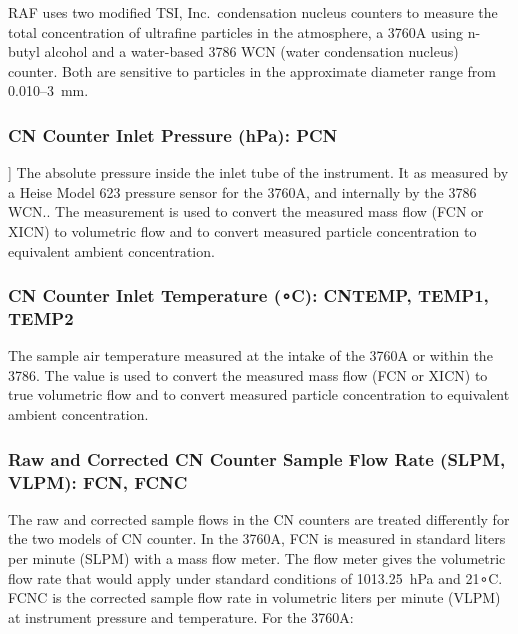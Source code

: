 \documentclass[
]{book}
\begin{document}
RAF uses two modified TSI, Inc.~condensation nucleus counters to measure the total concentration of ultrafine particles in the atmosphere, a 3760A using n-butyl alcohol and a water-based 3786 WCN (water condensation nucleus) counter. Both are sensitive to particles in the approximate diameter range from 0.010--3~\foreignlanguage{greek}{m}m.

\hypertarget{pcn}{%
\subsubsection*{CN Counter Inlet Pressure (hPa): PCN}\label{pcn}}

{]}
The absolute pressure inside the inlet tube of the instrument. It as measured by a Heise Model 623 pressure sensor for the 3760A, and internally by the 3786 WCN.. The measurement is used to convert the measured mass flow (FCN or XICN) to volumetric flow and to convert measured particle concentration to equivalent ambient concentration.

\hypertarget{cntemp}{%
\subsubsection*{\texorpdfstring{CN Counter Inlet Temperature ({∘}C): CNTEMP, TEMP1, TEMP2}{CN Counter Inlet Temperature (∘C): CNTEMP, TEMP1, TEMP2}}\label{cntemp}}

The sample air temperature measured at the intake of the 3760A or within the 3786. The value is used to convert the measured mass flow (FCN or XICN) to true volumetric flow and to convert measured particle concentration to equivalent ambient concentration.

\hypertarget{fcnc}{%
\subsubsection*{Raw and Corrected CN Counter Sample Flow Rate (SLPM, VLPM): FCN, FCNC}\label{fcnc}}

The raw and corrected sample flows in the CN counters are treated differently for the two models of CN counter. In the 3760A, FCN is measured in standard liters per minute (SLPM) with a mass flow meter. The flow meter gives the volumetric flow rate that would apply under standard conditions of 1013.25~hPa and 21{∘}C. FCNC is the corrected sample flow rate in volumetric liters per minute (VLPM) at instrument pressure and temperature. For the 3760A:
\end{document}
